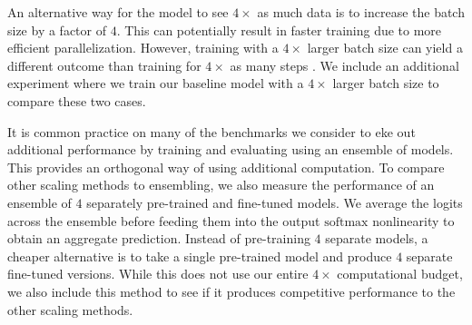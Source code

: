 \documentclass[twoside,11pt]{article}
\begin{document}
An alternative way for the model to see $4\times$ as much data is to increase the batch size by a factor of $4$.
This can potentially result in faster training due to more efficient parallelization.
However, training with a $4\times$ larger batch size can yield a different outcome than training for $4\times$ as many steps \citep{shallue2018measuring}.
We include an additional experiment where we train our baseline model with a $4\times$ larger batch size to compare these two cases.

It is common practice on many of the benchmarks we consider to eke out additional performance by training and evaluating using an ensemble of models.
This provides an orthogonal way of using additional computation.
To compare other scaling methods to ensembling, we also measure the performance of an ensemble of $4$ separately pre-trained and fine-tuned models.
We average the logits across the ensemble before feeding them into the output $\mathrm{softmax}$ nonlinearity to obtain an aggregate prediction.
Instead of pre-training $4$ separate models, a cheaper alternative is to take a single pre-trained model and produce $4$ separate fine-tuned versions.
While this does not use our entire $4\times$ computational budget, we also include this method to see if it produces competitive performance to the other scaling methods.
\end{document}
